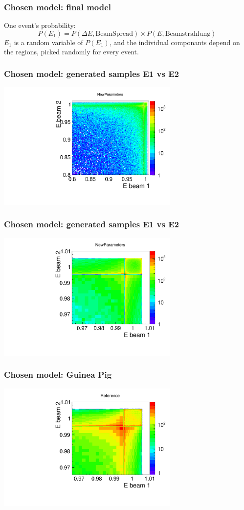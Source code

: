 \documentclass[handout]{beamer}
\begin{document}
\begin{frame}
\frametitle{Chosen model: final model}
One event's probability:
\begin{equation}
P(E_1) = P(\Delta E,\textrm{BeamSpread})\times 
P(E,\textrm{Beamstrahlung})
\end{equation}
$E_1$ is a random variable of $P(E_1)$, and the individual componants depend
on the regions, picked randomly for every event.
\end{frame}

\begin{frame}
\frametitle{Chosen model: generated samples E1 vs E2}
\centering
\includegraphics[width=9cm]{StartingParameters}
\end{frame}
\begin{frame}
\frametitle{Chosen model: generated samples E1 vs E2}
\centering
\includegraphics[width=9cm]{StartingParameters_zoomed}
\end{frame}
\begin{frame}
\frametitle{Chosen model: Guinea Pig}
\centering
\includegraphics[width=9cm]{Reference_zoomed}
\end{frame}
\end{document}
